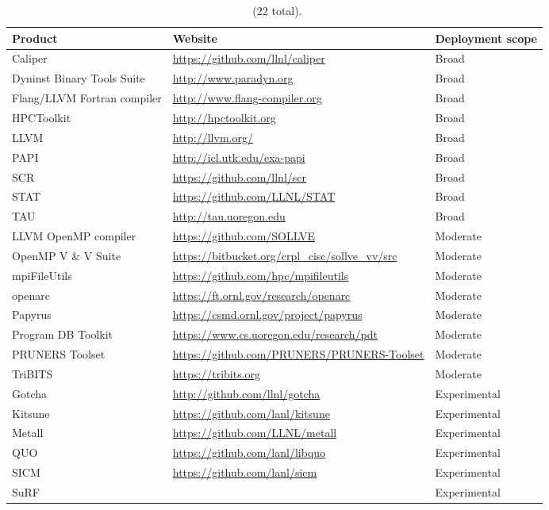 \begin{table}[H]
	\begin{tabularx}{\textwidth}{|l|l|X|}\hline
		\rowcolor{LightCyan}
		\textbf{Product} & \textbf{Website} & \textbf{Deployment scope}\\\hline

		Caliper & \url{https://github.com/llnl/caliper} & Broad\\\hline
		Dyninst Binary Tools Suite & \url{http://www.paradyn.org} & Broad\\\hline
	 	Flang/LLVM Fortran compiler & \url{http://www.flang-compiler.org} & Broad\\\hline
		HPCToolkit & \url{http://hpctoolkit.org} & Broad\\\hline
		LLVM & \url{http://llvm.org/} & Broad\\\hline
		PAPI & \url{http://icl.utk.edu/exa-papi} & Broad\\\hline
		SCR & \url{https://github.com/llnl/scr} & Broad\\\hline
	    STAT & \url{https://github.com/LLNL/STAT} & Broad\\\hline
		TAU & \url{http://tau.uoregon.edu} & Broad\\\hline

		LLVM OpenMP compiler & \url{https://github.com/SOLLVE} & Moderate\\\hline
		OpenMP V \& V Suite & \url{https://bitbucket.org/crpl_cisc/sollve_vv/src} & Moderate \\\hline
		mpiFileUtils & \url{https://github.com/hpc/mpifileutils} & Moderate\\\hline
		openarc & \url{https://ft.ornl.gov/research/openarc} & Moderate\\\hline
		Papyrus & \url{https://csmd.ornl.gov/project/papyrus} & Moderate\\\hline
		Program DB Toolkit & \url{https://www.cs.uoregon.edu/research/pdt} & Moderate\\\hline
	    PRUNERS Toolset & \url{https://github.com/PRUNERS/PRUNERS-Toolset} & Moderate\\\hline
		TriBITS & \url{https://tribits.org} & Moderate\\\hline

		Gotcha & \url{http://github.com/llnl/gotcha} & Experimental\\\hline
		Kitsune & \url{https://github.com/lanl/kitsune} & Experimental\\\hline
		Metall &  \url{https://github.com/LLNL/metall} & Experimental \\\hline
		QUO & \url{https://github.com/lanl/libquo} & Experimental\\\hline
		SICM & \url{https://github.com/lanl/sicm}  & Experimental \\\hline
		SuRF  & & Experimental\\\hline
\end{tabularx}
\caption{\label{table:tools-products} \tools~(22 total).}
\end{table}


